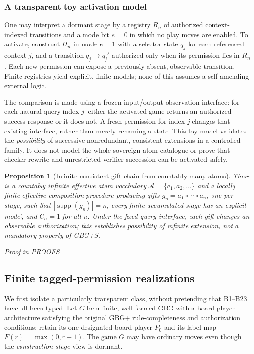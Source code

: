 \documentclass[11pt,letterpaper]{article}
\newtheorem{proposition}[theorem]{Proposition}
\theoremstyle{definition}\newtheorem{definition}[theorem]{Definition}\newtheorem{example}[theorem]{Example}
\theoremstyle{remark}\newtheorem{remark}[theorem]{Remark}
\newcommand{\Abs}{\mathcal{A}}
\newcommand{\proofat}[1]{\par\smallskip\noindent\hfill\textit{\hyperref[#1]{Proof in PROOFS}}}
\begin{document}
\subsubsection{A transparent toy activation model}
One may interpret a dormant stage by a registry $R_n$ of authorized context-indexed transitions and a mode bit $e=0$ in which no play moves are enabled. To activate, construct $H_n$ in mode $e=1$ with a selector state $q_j$ for each referenced context $j$, and a transition $q_j\to q_j'$ authorized only when its permission lies in $R_n$. Each new permission can expose a previously absent, observable transition. Finite registries yield explicit, finite models; none of this assumes a self-amending external logic.

The comparison is made using a frozen input/output observation interface: for each natural query index $j$, either the activated game returns an authorized success response or it does not. A fresh permission for index $j$ changes that existing interface, rather than merely renaming a state. This toy model validates the \emph{possibility} of successive nonredundant, consistent extensions in a controlled family. It does not model the whole sovereign atom catalogue or prove that checker-rewrite and unrestricted verifier succession can be activated safely.

\begin{proposition}[Infinite consistent gift chain from countably many atoms]\label{w0:prop:infinite}
There is a countably infinite effective atom vocabulary $\Abs=\{a_1,a_2,\ldots\}$ and a locally finite effective composition procedure producing gifts $g_n=a_1\circ\cdots\circ a_n$, one per stage, such that $|\operatorname{supp}(g_n)|=n$, every finite accumulated stage has an explicit model, and $C_n=1$ for all $n$. Under the fixed query interface, each gift changes an observable authorization; this establishes \emph{possibility} of infinite extension, not a mandatory property of GBG+S.\proofat{w0:pr:infinite}
\end{proposition}


\subsection{Finite tagged-permission realizations}
We first isolate a particularly transparent class, without pretending that B1--B23 have all been typed. Let $G$ be a finite, well-formed GBG with a board-player architecture satisfying the original GBG+ rule-completeness and authorization conditions; retain its one designated board-player $P_0$ and its label map $F(r)=\max(0,r-1)$. The game $G$ may have ordinary moves even though the \emph{construction-stage} view is dormant.
\end{document}
